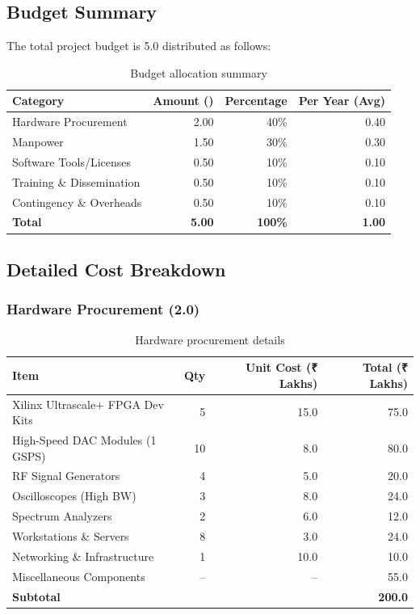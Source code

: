 \documentclass[12pt,a4paper]{article}
\newcommand{\rupees}[1]{\text{₹}#1}
\newcommand{\crore}[1]{\rupees{#1}\text{ crores}}
\theoremstyle{definition}
\begin{document}
\subsection{Budget Summary}

The total project budget is \crore{5.0} distributed as follows:

\begin{table}[htbp]
\centering
\caption{Budget allocation summary}
\label{tab:budget}
\begin{tabular}{@{}lrrr@{}}
\toprule
\textbf{Category} & \textbf{Amount (\crore{})} & \textbf{Percentage} & \textbf{Per Year (Avg)} \\
\midrule
Hardware Procurement & 2.00 & 40\% & 0.40 \\
Manpower & 1.50 & 30\% & 0.30 \\
Software Tools/Licenses & 0.50 & 10\% & 0.10 \\
Training \& Dissemination & 0.50 & 10\% & 0.10 \\
Contingency \& Overheads & 0.50 & 10\% & 0.10 \\
\midrule
\textbf{Total} & \textbf{5.00} & \textbf{100\%} & \textbf{1.00} \\
\bottomrule
\end{tabular}
\end{table}

\subsection{Detailed Cost Breakdown}

\subsubsection{Hardware Procurement (\crore{2.0})}

\begin{table}[htbp]
\centering
\caption{Hardware procurement details}
\label{tab:hardware_cost}
\begin{tabular}{@{}p{5cm}rrr@{}}
\toprule
\textbf{Item} & \textbf{Qty} & \textbf{Unit Cost (₹ Lakhs)} & \textbf{Total (₹ Lakhs)} \\
\midrule
Xilinx Ultrascale+ FPGA Dev Kits & 5 & 15.0 & 75.0 \\
High-Speed DAC Modules (1 GSPS) & 10 & 8.0 & 80.0 \\
RF Signal Generators & 4 & 5.0 & 20.0 \\
Oscilloscopes (High BW) & 3 & 8.0 & 24.0 \\
Spectrum Analyzers & 2 & 6.0 & 12.0 \\
Workstations \& Servers & 8 & 3.0 & 24.0 \\
Networking \& Infrastructure & 1 & 10.0 & 10.0 \\
Miscellaneous Components & -- & -- & 55.0 \\
\midrule
\textbf{Subtotal} & & & \textbf{200.0} \\
\bottomrule
\end{tabular}
\end{table}
\end{document}
